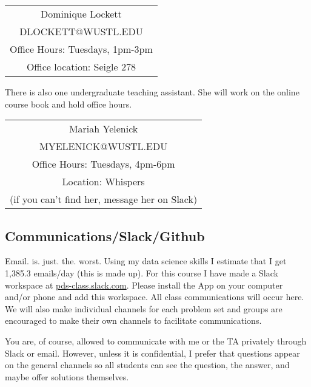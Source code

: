 \documentclass[11pt]{article}
\begin{document}
\begin{center}
\begin{small}
\begin{tabular}{c}
Dominique Lockett \\
DLOCKETT@WUSTL.EDU\\
Office Hours: Tuesdays, 1pm-3pm\\
Office location: Seigle 278
\end{tabular}
\end{small}
\end{center}

There is also one undergraduate teaching assistant. She will work on the online course book and hold office hours.
\vspace{.2cm}

\begin{center}
\begin{small}
\begin{tabular}{c}
Mariah Yelenick \\
MYELENICK@WUSTL.EDU\\
Office Hours: Tuesdays, 4pm-6pm\\
Location: Whispers\\
(if you can't find her, message her on Slack)
\end{tabular}
\end{small}
\end{center}

\subsection*{Communications/Slack/Github}

Email. is. just. the. worst.  Using my data science skills I estimate that I get 1,385.3 emails/day (this is made up). For this course I have made a Slack workspace at \url{pds-class.slack.com}.  Please install the App on your computer and/or phone and add this workspace.  All class communications will occur here. We will also make individual channels for each problem set and groups are encouraged to make their own channels to facilitate communications.  

You are, of course, allowed to communicate with me or the TA privately through Slack or email.  However, unless it is confidential, I prefer that questions appear on the general channels so all students can see the question, the answer, and maybe offer solutions themselves.
\end{document}
